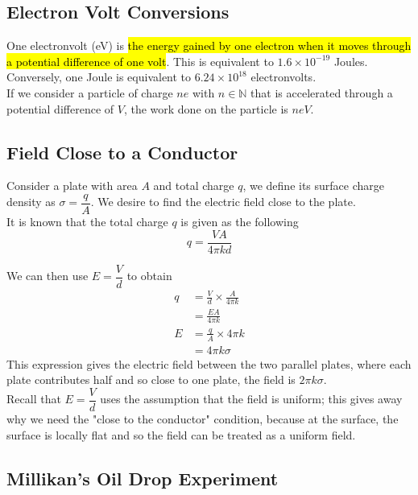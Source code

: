 \documentclass[a4paper,12pt]{article}
\newcommand{\lb}{\\[8pt]}
\begin{document}
\subsection{Electron Volt Conversions}

One electronvolt (eV) is \hl{the energy gained by one electron when it moves through a potential difference of one volt}. This is equivalent to $1.6 \times 10^{-19}$ Joules.\lb
Conversely, one Joule is equivalent to $6.24 \times 10^{18}$ electronvolts.\lb
If we consider a particle of charge $ne$ with $n\in \mathbb{N}$ that is accelerated through a potential difference of $V$, the work done on the particle is $neV$.

\pagebreak

\subsection{Field Close to a Conductor}

Consider a plate with area $A$ and total charge $q$, we define its surface charge density as $\sigma = \dfrac{q}{A}$. We desire to find the electric field close to the plate.\lb
It is known that the total charge $q$ is given as the following
\begin{equation}\label{eq:charge}
  q = \frac{VA}{4\pi kd}
\end{equation}

We can then use $E = \dfrac{V}{d}$ to obtain
\begin{align*}
  q & = \frac{V}{d}\times\frac{A}{4\pi k} \\
    & = \frac{EA}{4\pi k}                 \\
  E & = \frac{q}{A} \times 4\pi k         \\
    & =  4\pi k\sigma
\end{align*}
This expression gives the electric field between the two parallel plates, where each plate contributes half and so close to one plate, the field is $2\pi k\sigma$.\lb
Recall that $E = \dfrac{V}{d}$ uses the assumption that the field is uniform; this gives away why we need the "close to the conductor" condition, because at the surface, the surface is locally flat and so the field can be treated as a uniform field.

\pagebreak

\subsection{Millikan's Oil Drop Experiment}
\end{document}
